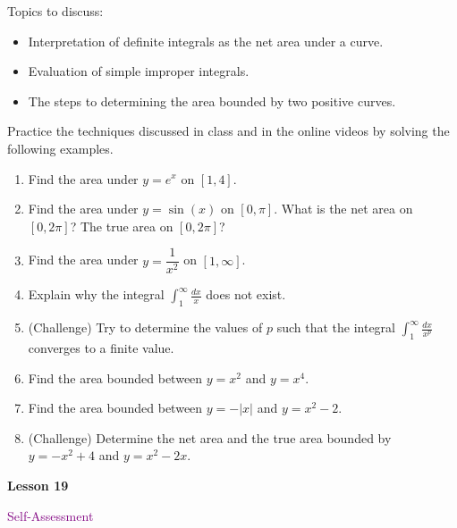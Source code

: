 \documentclass[10pt]{book}
\theoremstyle{definition}
\theoremstyle{remark}
\begin{document}
\begin{large}
\noindent
Topics to discuss:
\begin{itemize}
\item Interpretation of definite integrals as the net area under a curve. 
\item Evaluation of simple improper integrals.
\item The steps to determining the area bounded by two positive curves. 
\end{itemize}
\newpage

\noindent
Practice the techniques discussed in class and in the online videos by solving the following examples. 
\begin{enumerate}
\item Find the area under $y = e^x$ on $[1,4]$. \vfil\vfil
\item Find the area under $y = \sin(x)$ on $[0,\pi]$. What is the net area on $[0,2\pi]$? The true area on $[0,2\pi]$? \vfil
\newpage

\item Find the area under $y = \dfrac{1}{x^2}$ on $[1,\infty]$.\vfil\vfil
\item Explain why the integral $\displaystyle \int_{1}^{\infty} \frac{dx}{x}$ does not exist.\vfil\vfil
\item (Challenge) Try to determine the values of $p$ such that the integral $\displaystyle \int_{1}^{\infty} \frac{dx}{x^{p}}$ converges to a finite value.\vfil
\newpage

\item Find the area bounded between $y = x^2$ and $y =x^4$.\vfil\vfil
\item Find the area bounded between $y = -|x|$ and $y = x^2-2$.\vfil\vfil
\item (Challenge) Determine the net area and the true area bounded by $y=-x^2+4$ and $y=x^2-2x$.\vfil
\end{enumerate}
\end{large}
\newpage


\begin{tcolorbox}[
  width=\textwidth,
  colback=gray!10, %
  colframe=white, %
  boxrule=0pt,    %
  left=1cm,       %
  right=1cm,      %
  sharp corners  %
]

\begin{minipage}[t]{0.5\textwidth}
  \Huge \textbf{Lesson 19}
\end{minipage}%
\hfill
\begin{minipage}[t]{0.5\textwidth}
  \Huge\textcolor{purple}{Self-Assessment}
\end{minipage}
\end{tcolorbox}
\end{document}
